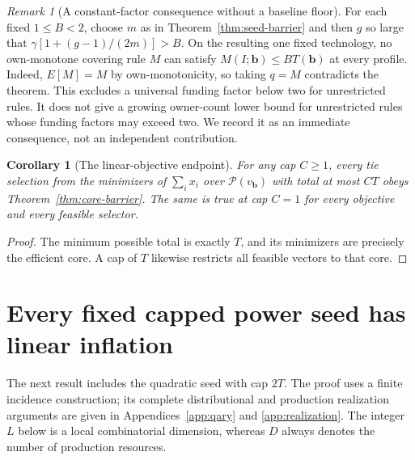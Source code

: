\documentclass[11pt]{article}
\newtheorem{corollary}[theorem]{Corollary}
\theoremstyle{definition}
\theoremstyle{remark}
\newtheorem{remark}[theorem]{Remark}
\begin{document}
\begin{remark}[A constant-factor consequence without a baseline floor]
\label{rem:constant-two}
For each fixed $1\le B<2$, choose $m$ as in Theorem~\ref{thm:seed-barrier}
and then $g$ so large that $\gamma[1+(g-1)/(2m)]>B$.  On the resulting one
fixed technology, no own-monotone covering rule $M$ can satisfy
$M(I;\mathbf b)\le B T(\mathbf b)$ at every profile.  Indeed,
$E[M]=M$ by own-monotonicity, so taking $q=M$ contradicts the theorem.
This excludes a universal funding factor below two for unrestricted rules.
It does not give a growing owner-count lower bound for unrestricted rules
whose funding factors may exceed two.  We record it as an immediate
consequence, not an independent contribution.
\end{remark}

\begin{corollary}[The linear-objective endpoint]
\label{cor:r-one}
For any cap $C\ge1$, every tie selection from the minimizers of
$\sum_i x_i$ over $\mathcal P(v_{\mathbf b})$ with total at most $CT$
obeys Theorem~\ref{thm:core-barrier}.  The same is true at cap $C=1$
for every objective and every feasible selector.
\end{corollary}
\begin{proof}
The minimum possible total is exactly $T$, and its minimizers are precisely
the efficient core.  A cap of $T$ likewise restricts all feasible vectors
to that core.
\end{proof}

\section{Every fixed capped power seed has linear inflation}
\label{sec:fixed-caps}

The next result includes the quadratic seed with cap $2T$.  The proof uses
a finite incidence construction; its complete distributional and production
realization arguments are given in Appendices~\ref{app:qary} and
\ref{app:realization}.  The integer $L$ below is a local combinatorial
dimension, whereas $D$ always denotes the number of production resources.
\end{document}
